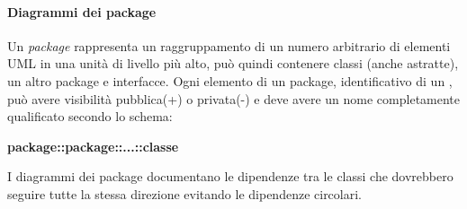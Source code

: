 \paragraph*{Diagrammi dei package}
Un \textit{package} rappresenta un raggruppamento di un numero arbitrario di elementi UML in una unità di livello più alto, può quindi contenere classi (anche astratte), un altro package e interfacce. Ogni elemento di un package, identificativo di un , può avere visibilità pubblica(+) o privata(-) e deve avere un nome completamente qualificato secondo lo schema: 
\begin{center}
	\textbf{package::package::...::classe}
\end{center}
I diagrammi dei package documentano le dipendenze tra le classi che dovrebbero seguire tutte la stessa direzione evitando le dipendenze circolari.

